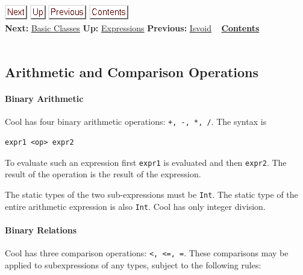 \documentclass[]{article}
\begin{document}
\href{node26.html}{\includegraphics{next.png}}
\href{node13.html}{\includegraphics{up.png}}
\href{node24.html}{\includegraphics{prev.png}}
\href{node1.html}{\includegraphics{contents.png}} \\ \textbf{Next:}
\href{node26.html}{Basic Classes} \textbf{Up:}
\href{node13.html}{Expressions} \textbf{Previous:}
\href{node24.html}{Isvoid} ~ \textbf{\href{node1.html}{Contents}} \\ \\

\subsection{Arithmetic and Comparison Operations}

\paragraph{Binary Arithmetic}

Cool has four binary arithmetic operations: \texttt{+, -, *, /}. The
syntax is

\begin{verbatim}
expr1 <op> expr2
\end{verbatim}

To evaluate such an expression first \texttt{expr1} is evaluated and
then \texttt{expr2}. The result of the operation is the result of the
expression.

The static types of the two sub-expressions must be \texttt{Int}. The
static type of the entire arithmetic expression is also \texttt{Int}.
Cool has only integer division.

\paragraph{Binary Relations}

Cool has three comparison operations:
\texttt{\textless{}, \textless{}=, =}. These comparisons may be applied
to subexpressions of any types, subject to the following rules:
\end{document}
